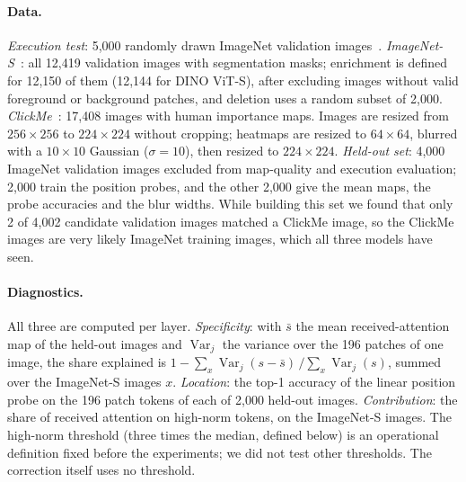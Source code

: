 \paragraph{Data.} \emph{Execution test}: 5,000 randomly drawn ImageNet validation images~\citep{deng2009}. \emph{ImageNet-S}~\citep{gao2023}: all 12,419 validation images with segmentation masks; enrichment is defined for 12,150 of them (12,144 for DINO ViT-S), after excluding images without valid foreground or background patches, and deletion uses a random subset of 2,000. \emph{ClickMe}~\citep{linsley2019,fel2022}: 17,408 images with human importance maps. Images are resized from $256{\times}256$ to $224{\times}224$ without cropping; heatmaps are resized to $64{\times}64$, blurred with a $10{\times}10$ Gaussian ($\sigma=10$), then resized to $224{\times}224$. \emph{Held-out set}: 4,000 ImageNet validation images excluded from map-quality and execution evaluation; 2,000 train the position probes, and the other 2,000 give the mean maps, the probe accuracies and the blur widths. While building this set we found that only 2 of 4,002 candidate validation images matched a ClickMe image, so the ClickMe images are very likely ImageNet training images, which all three models have seen.

\paragraph{Diagnostics.} All three are computed per layer. \emph{Specificity}: with $\bar s$ the mean received-attention map of the held-out images and $\operatorname{Var}_j$ the variance over the 196 patches of one image, the share explained is $1-\sum_x\operatorname{Var}_j(s-\bar s)\,/\sum_x\operatorname{Var}_j(s)$, summed over the ImageNet-S images $x$. \emph{Location}: the top-1 accuracy of the linear position probe on the 196 patch tokens of each of 2,000 held-out images. \emph{Contribution}: the share of received attention on high-norm tokens, on the ImageNet-S images. The high-norm threshold (three times the median, defined below) is an operational definition fixed before the experiments; we did not test other thresholds. The correction itself uses no threshold.

